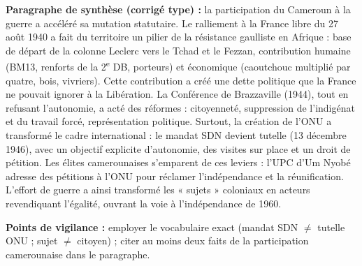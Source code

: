 \documentclass[11pt]{article}
\begin{document}
\begin{corrige}
\textbf{Paragraphe de synthèse (corrigé type) :} la participation du Cameroun à la guerre a accéléré sa mutation statutaire. Le ralliement à la France libre du 27 août 1940 a fait du territoire un pilier de la résistance gaulliste en Afrique : base de départ de la colonne Leclerc vers le Tchad et le Fezzan, contribution humaine (BM13, renforts de la 2\textsuperscript{e} DB, porteurs) et économique (caoutchouc multiplié par quatre, bois, vivriers). Cette contribution a créé une dette politique que la France ne pouvait ignorer à la Libération. La Conférence de Brazzaville (1944), tout en refusant l'autonomie, a acté des réformes : citoyenneté, suppression de l'indigénat et du travail forcé, représentation politique. Surtout, la création de l'ONU a transformé le cadre international : le mandat SDN devient tutelle (13 décembre 1946), avec un objectif explicite d'autonomie, des visites sur place et un droit de pétition. Les élites camerounaises s'emparent de ces leviers : l'UPC d'Um Nyobé adresse des pétitions à l'ONU pour réclamer l'indépendance et la réunification. L'effort de guerre a ainsi transformé les « sujets » coloniaux en acteurs revendiquant l'égalité, ouvrant la voie à l'indépendance de 1960.

\textbf{Points de vigilance :} employer le vocabulaire exact (mandat SDN $\neq$ tutelle ONU ; sujet $\neq$ citoyen) ; citer au moins deux faits de la participation camerounaise dans le paragraphe.
\end{corrige}
\end{document}
